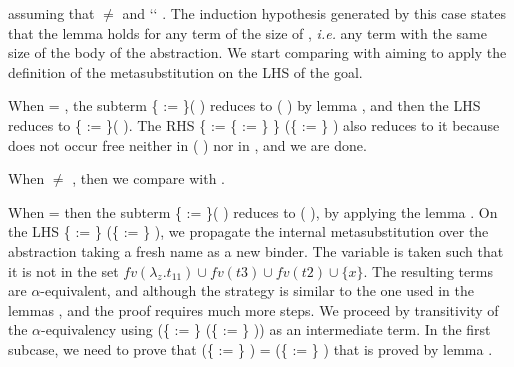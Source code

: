 \noindent assuming that  \ensuremath{\not=}  and  ``  . The induction hypothesis generated by this case states that the lemma holds for any term of the size of , {\it i.e.} any term with the same size of the body of the abstraction. We start comparing  with  aiming to apply the definition of the metasubstitution on the LHS of the goal.
\begin{coqdoccode}
\end{coqdoccode}
When  = , the subterm \{ := \}(  ) reduces to (  ) by lemma , and then the LHS reduces to \{ := \}(  ). The RHS \{ := \{ := \} \} (\{ := \}   ) also reduces to it because  does not occur free neither in (  ) nor in , and we are done.
\begin{coqdoccode}
\end{coqdoccode}
When  \ensuremath{\not=} , then we compare  with .
\begin{coqdoccode}
\end{coqdoccode}
When  =  then the subterm \{ := \}(  ) reduces to (  ), by applying the lemma . On the LHS \{ := \} (\{ := \}   ), we propagate the internal metasubstitution over the abstraction taking a fresh name  as a new binder. The variable  is taken such that it is not in the set $fv(\lambda_z.t_{11}) \cup fv(t3) \cup fv(t2) \cup \{x\}$. The resulting terms are $\alpha$-equivalent, and although the strategy is similar to the one used in the lemmas ,  and  the proof requires much more steps. We proceed by transitivity of the $\alpha$-equivalency using (\{ := \}   (\{ := \}    )) as an intermediate term. In the first subcase, we need to prove that (\{ := \}   ) =   (\{ := \}    ) that is proved by lemma .

